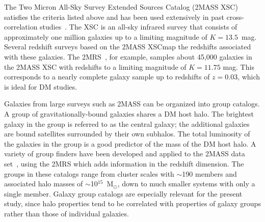 The Two Micron All-Sky Survey Extended Sources Catalog (2MASS XSC)~\cite{Bilicki:2013sza,Huchra:2011ii}  satisfies the criteria listed above and has been used extensively in past cross-correlation studies~\cite{Ando:2013xwa,Ando:2014aoa,Ando:2016ang,Cuoco:2015rfa,Regis:2015zka,Xia:2011ax,Xia:2015wka}. The XSC is an all-sky infrared survey that consists of approximately one million galaxies up to a limiting magnitude of $K = 13.5$~mag. Several redshift surveys based on the 2MASS XSCmap the redshifts associated with these galaxies. The 2MRS~\cite{Huchra:2011ii}, for example, samples about 45,000 galaxies in the 2MASS XSC with redshifts to a limiting magnitude of $K=11.75$ mag. This corresponds to a nearly complete galaxy sample up to redshifts of $z=0.03$, which is ideal for DM studies.

Galaxies from large surveys such as 2MASS can be organized into group catalogs.  A group of gravitationally-bound galaxies shares a DM host halo.  The  brightest galaxy in the group is referred to as the central galaxy; the additional galaxies are bound satellites surrounded by their own subhalos.  The total luminosity of the galaxies in the group is a good predictor of the mass of the DM host halo.  A variety of group finders have been developed and applied to the 2MASS data set~\cite{Tully:2015opa,Lu:2016vmu,2017ApJ...843...16K}, using the 2MRS which adds information in the redshift dimension.  The groups in these catalogs range from cluster scales with $\sim$190 members and associated halo masses of $\sim$10$^{15}$~M$_\odot$, down to much smaller systems with only a single member. Galaxy group catalogs are especially relevant for the present study, since halo properties tend to be correlated with properties of galaxy groups rather than those of individual galaxies.


